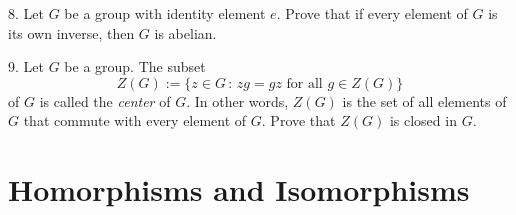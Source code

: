 \documentclass[10pt,]{book}
\theoremstyle{plain}
\theoremstyle{definition}
\theoremstyle{definition}
\theoremstyle{definition}
\theoremstyle{definition}
\numberwithin{equation}{section}
\begin{document}
\begin{exerciselist}
\begin{enumerate}[label=(\alph*)]
\end{enumerate}
\par\smallskip
\item[8.]\hypertarget{exercise-19}{}Let \(G\) be a group with identity element \(e\). Prove that if every element of \(G\) is its own inverse, then \(G\) is abelian.%
\par\smallskip
\item[9.]\hypertarget{exercise-20}{}Let \(G\) be a group. The subset%
\begin{equation*}
Z(G):=\{z \in G\,:\, zg=gz \mbox{ for all } g\in Z(G)\}
\end{equation*}
of \(G\) is called the \emph{center} of \(G\). In other words, \(Z(G)\) is the set of all elements of \(G\) that commute with every element of \(G\). Prove that \(Z(G)\) is closed in \(G\).%
\par\smallskip
\end{exerciselist}
\typeout{************************************************}
\typeout{************************************************}
\chapter[{Homorphisms and Isomorphisms}]{Homorphisms and Isomorphisms}\label{homoiso}
\typeout{************************************************}
\typeout{************************************************}
\end{document}
